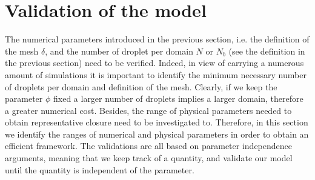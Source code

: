 
\section{Validation of the model}

The numerical parameters introduced in the previous section, i.e. the definition of the mesh $\delta$, and the number of droplet per domain $N$ or $N_b$ (see the definition in the previous section) need to be verified. 
Indeed, in view of carrying a numerous amount of simulations it is important to identify the minimum necessary number of droplets per domain and definition of the mesh.
Clearly, if we keep the parameter $\phi$ fixed a larger number of droplets implies a larger domain, therefore a greater numerical cost.  
Besides, the range of physical parameters needed to obtain representative closure need to be investigated to. 
Therefore, in this section we identify the ranges of numerical and physical parameters in order to obtain an efficient framework. 
The validations are all based on parameter independence arguments, meaning that we keep track of a quantity, and validate our model until the quantity is independent of the parameter. 


